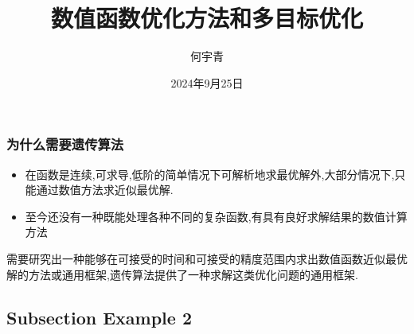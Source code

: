 \documentclass{beamer}
\title{数值函数优化方法和多目标优化}
\author{何宇青} %
\date{2024年9月25日} %
\begin{document}
	
	\begin{frame}
		\titlepage %
	\end{frame}
	\begin{frame}
		\frametitle{为什么需要遗传算法}
		\begin{itemize}
			\item 在函数是连续,可求导,低阶的简单情况下可解析地求最优解外,大部分情况下,只能通过数值方法求近似最优解.
			\item 至今还没有一种既能处理各种不同的复杂函数,有具有良好求解结果的数值计算方法
			
		\end{itemize}
		需要研究出一种能够在可接受的时间和可接受的精度范围内求出数值函数近似最优解的方法或通用框架,遗传算法提供了一种求解这类优化问题的通用框架.
	\end{frame}

	\subsection{Subsection Example 2}
	
\end{document}
